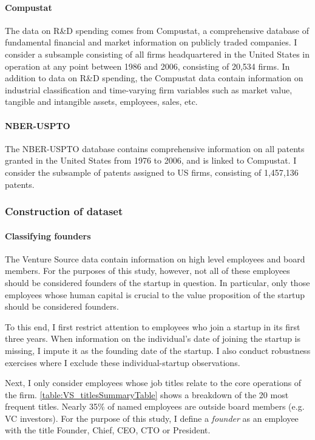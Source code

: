 \documentclass[11pt,english]{article}
\theoremstyle{remark}
\begin{document}
\paragraph{Compustat}

The data on R\&D spending comes from Compustat, a comprehensive database of fundamental financial and market information on publicly traded companies. I consider a subsample consisting of all firms headquartered in the United States in operation at any point between 1986 and 2006, consisting of 20,534 firms. In addition to data on R\&D spending, the Compustat data contain information on industrial classification and time-varying firm variables such as market value, tangible and intangible assets, employees, sales, etc.

\paragraph{NBER-USPTO}

The NBER-USPTO database contains comprehensive information on all patents granted in the United States from 1976 to 2006, and is linked to Compustat. I consider the subsample of patents assigned to US firms, consisting of 1,457,136 patents. 

\subsubsection{Construction of dataset}

\paragraph{Classifying founders}

The Venture Source data contain information on high level employees and board members. For the purposes of this study, however, not all of these employees should be considered founders of the startup in question. In particular, only those employees whose human capital is crucial to the value proposition of the startup should be considered founders. 

To this end, I first restrict attention to employees who join a startup in its first three years. When information on the individual's date of joining the startup is missing, I impute it as the founding date of the startup. I also conduct robustness exercises where I exclude these individual-startup observations. 

Next, I only consider employees whose job titles relate to the core operations of the firm. \autoref{table:VS_titlesSummaryTable} shows a breakdown of the 20 most frequent titles. Nearly 35\% of named employees are outside board members (e.g. VC investors). For the purpose of this study, I define a \textit{founder} as an employee with the title Founder, Chief, CEO, CTO or President. 
\end{document}
